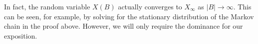   In fact, the random variable $X(B)$
  actually converges to $X_\infty$ as $|B| \rightarrow \infty$. 
  This can be seen, for example, 
  by solving for the stationary distribution of the Markov chain in the proof above. 
  However, we will only require the dominance for our exposition. 

